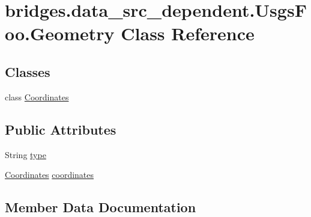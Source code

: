 \hypertarget{classbridges_1_1data__src__dependent_1_1_usgs_foo_1_1_geometry}{}\section{bridges.\+data\+\_\+src\+\_\+dependent.\+Usgs\+Foo.\+Geometry Class Reference}
\label{classbridges_1_1data__src__dependent_1_1_usgs_foo_1_1_geometry}
\subsection*{Classes}
\begin{DoxyCompactItemize}
\item 
class \mbox{\hyperlink{classbridges_1_1data__src__dependent_1_1_usgs_foo_1_1_geometry_1_1_coordinates}{Coordinates}}
\end{DoxyCompactItemize}
\subsection*{Public Attributes}
\begin{DoxyCompactItemize}
\item 
String \mbox{\hyperlink{classbridges_1_1data__src__dependent_1_1_usgs_foo_1_1_geometry_a985b3a46dad2fcd4e798d2f51198bcfd}{type}}
\item 
\mbox{\hyperlink{classbridges_1_1data__src__dependent_1_1_usgs_foo_1_1_geometry_1_1_coordinates}{Coordinates}} \mbox{\hyperlink{classbridges_1_1data__src__dependent_1_1_usgs_foo_1_1_geometry_a339e388c47a5d03c946c875d690ee514}{coordinates}}
\end{DoxyCompactItemize}


\subsection{Member Data Documentation}
\mbox{\label{classbridges_1_1data__src__dependent_1_1_usgs_foo_1_1_geometry_a339e388c47a5d03c946c875d690ee514}} 
